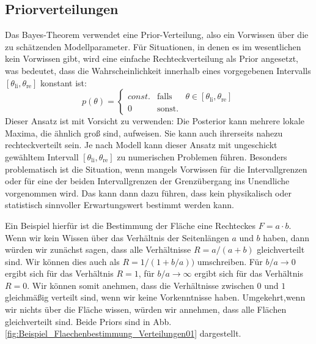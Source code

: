 \subsection{Priorverteilungen}
Das Bayes-Theorem verwendet eine Prior-Verteilung, also ein Vorwissen über die zu schätzenden Modellparameter.
Für Situationen, in denen es im wesentlichen kein Vorwissen gibt, wird eine einfache Rechteckverteilung als Prior angesetzt, was bedeutet, dass die Wahrscheinlichkeit innerhalb eines vorgegebenen Intervalls $[\theta_\mathrm{li},\theta_\mathrm{re}]$ konstant ist:
\[
p(\theta) = \left\{\begin{array}{lll}
const. & \textrm{falls} & \theta \in [\theta_\mathrm{li},\theta_\mathrm{re}]\\
0 & \textrm{sonst.} &
\end{array}\right.
\]
Dieser Ansatz ist mit Vorsicht zu verwenden:
Die Posterior kann mehrere lokale Maxima, die ähnlich groß sind, aufweisen.
Sie kann auch ihrerseits nahezu rechteckverteilt sein.
Je nach Modell kann dieser Ansatz mit ungeschickt gewähltem Intervall
$[\theta_\mathrm{li},\theta_\mathrm{re}]$ zu numerischen Problemen führen.
Besonders problematisch ist die Situation, wenn mangels Vorwissen für die Intervallgrenzen
oder für eine der beiden Intervallgrenzen der Grenzübergang ins Unendliche vorgenommen wird.
Das kann dann dazu führen, dass kein physikalisch oder statistisch sinnvoller
Erwartungswert bestimmt werden kann. 

Ein Beispiel hierfür ist die Bestimmung der Fläche eine Rechteckes $F=a \cdot b$.
Wenn wir kein Wissen über das Verhältnis der Seitenlängen $a$ und $b$ 
haben, dann würden wir zunächst sagen, dass alle Verhältnisse $R = a/(a+b)$ gleichverteilt sind. Wir können dies auch als $R=1/(1+b/a))$
umschreiben. Für $b/a \rightarrow 0$ ergibt sich für das Verhältnis 
$R=1$, für $b/a \rightarrow \infty$ ergibt sich für das Verhältnis
$R=0$. Wir können somit anehmen, dass die Verhältnisse zwischen 
$0$ und $1$ gleichmäßig verteilt sind, wenn wir keine Vorkenntnisse 
haben. 
Umgekehrt,wenn wir nichts über die Fläche wissen, würden wir annehmen, dass alle Flächen gleichverteilt sind. Beide Priors sind in Abb. \ref{fig:Beispiel_Flaechenbestimmung_Verteilungen01} dargestellt.

